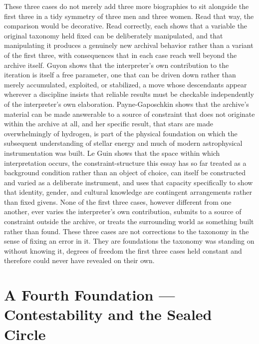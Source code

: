 \documentclass[11pt]{article}
\begin{document}
These three cases do not merely add three more biographies to sit alongside the first three in a tidy symmetry of three men and three women. Read that way, the comparison would be decorative. Read correctly, each shows that a variable the original taxonomy held fixed can be deliberately manipulated, and that manipulating it produces a genuinely new archival behavior rather than a variant of the first three, with consequences that in each case reach well beyond the archive itself. Guyon shows that the interpreter's own contribution to the iteration is itself a free parameter, one that can be driven down rather than merely accumulated, exploited, or stabilized, a move whose descendants appear wherever a discipline insists that reliable results must be checkable independently of the interpreter's own elaboration. Payne-Gaposchkin shows that the archive's material can be made answerable to a source of constraint that does not originate within the archive at all, and her specific result, that stars are made overwhelmingly of hydrogen, is part of the physical foundation on which the subsequent understanding of stellar energy and much of modern astrophysical instrumentation was built. Le Guin shows that the space within which interpretation occurs, the constraint-structure this essay has so far treated as a background condition rather than an object of choice, can itself be constructed and varied as a deliberate instrument, and uses that capacity specifically to show that identity, gender, and cultural knowledge are contingent arrangements rather than fixed givens. None of the first three cases, however different from one another, ever varies the interpreter's own contribution, submits to a source of constraint outside the archive, or treats the surrounding world as something built rather than found. These three cases are not corrections to the taxonomy in the sense of fixing an error in it. They are foundations the taxonomy was standing on without knowing it, degrees of freedom the first three cases held constant and therefore could never have revealed on their own.

\section{A Fourth Foundation --- Contestability and the Sealed Circle}
\end{document}
